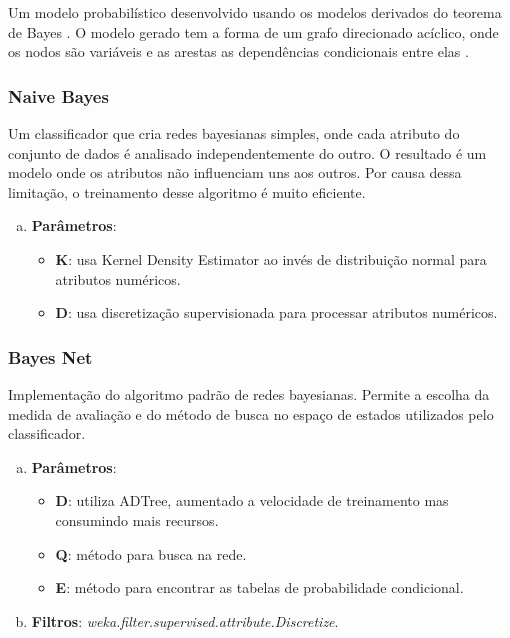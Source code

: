 Um modelo probabilístico desenvolvido usando os modelos derivados do teorema de Bayes \cite{Bayes1763}. O modelo gerado tem a forma de um grafo direcionado acíclico, onde os nodos são variáveis e as arestas as dependências condicionais entre elas \cite{Pearl1988}.

\subsubsection{Naive Bayes}

Um classificador que cria redes bayesianas simples, onde cada atributo do conjunto de dados é analisado independentemente do outro. O resultado é um modelo onde os atributos não influenciam uns aos outros. Por causa dessa limitação, o treinamento desse algoritmo é muito eficiente.

\begin{enumerate}[a)]
    \item \textbf{Parâmetros}:
        \begin{itemize}

            \item \textbf{K}: usa Kernel Density Estimator ao invés de distribuição normal para atributos numéricos.

            \item \textbf{D}: usa discretização supervisionada para processar atributos numéricos.
        \end{itemize}
\end{enumerate}

\subsubsection{Bayes Net}

Implementação do algoritmo padrão de redes bayesianas. Permite a escolha da medida de avaliação e do método de busca no espaço de estados utilizados pelo classificador.

\begin{enumerate}[a)]
    \item \textbf{Parâmetros}:
        \begin{itemize}

            \item \textbf{D}: utiliza ADTree, aumentado a velocidade de treinamento mas consumindo mais recursos.

            \item \textbf{Q}: método para busca na rede.

            \item \textbf{E}: método para encontrar as tabelas de probabilidade condicional.
        \end{itemize}
    \item \textbf{Filtros}: \emph{weka.filter.supervised.attribute.Discretize}.
\end{enumerate}

